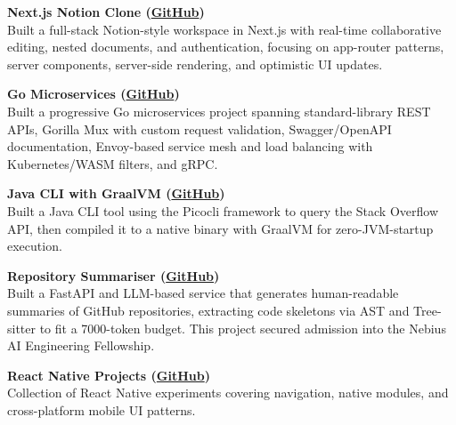 \documentclass[a4paper,10pt]{article}
\newcommand{\project}[2]{
  \textbf{\color{accent}#1}\\
  {\small #2}
}
\begin{document}
\vspace{2pt}
\project{Next.js Notion Clone \small{(\href{https://github.com/aymanapatel/nextjs-notion-clone}{GitHub})}}{Built a full-stack Notion-style workspace in Next.js with real-time collaborative editing, nested documents, and authentication, focusing on app-router patterns, server components, server-side rendering, and optimistic UI updates.}

\vspace{2pt}
\project{Go Microservices \small{(\href{https://github.com/aymanapatel/golang-microservices}{GitHub})}}{Built a progressive Go microservices project spanning standard-library REST APIs, Gorilla Mux with custom request validation, Swagger/OpenAPI documentation, Envoy-based service mesh and load balancing with Kubernetes/WASM filters, and gRPC.}

\vspace{2pt}
\project{Java CLI with GraalVM \small{(\href{https://github.com/aymanapatel/java-cli}{GitHub})}}{Built a Java CLI tool using the Picocli framework to query the Stack Overflow API, then compiled it to a native binary with GraalVM for zero-JVM-startup execution.}

\vspace{2pt}
\project{Repository Summariser \small{(\href{https://github.com/aymanapatel/nebius-project}{GitHub})}}{Built a FastAPI and LLM-based service that generates human-readable summaries of GitHub repositories, extracting code skeletons via AST and Tree-sitter to fit a 7000-token budget. This project secured admission into the Nebius AI Engineering Fellowship.}

\vspace{2pt}
\project{React Native Projects \small{(\href{https://github.com/aymanapatel/react-native-projects}{GitHub})}}{Collection of React Native experiments covering navigation, native modules, and cross-platform mobile UI patterns.}
\end{document}

